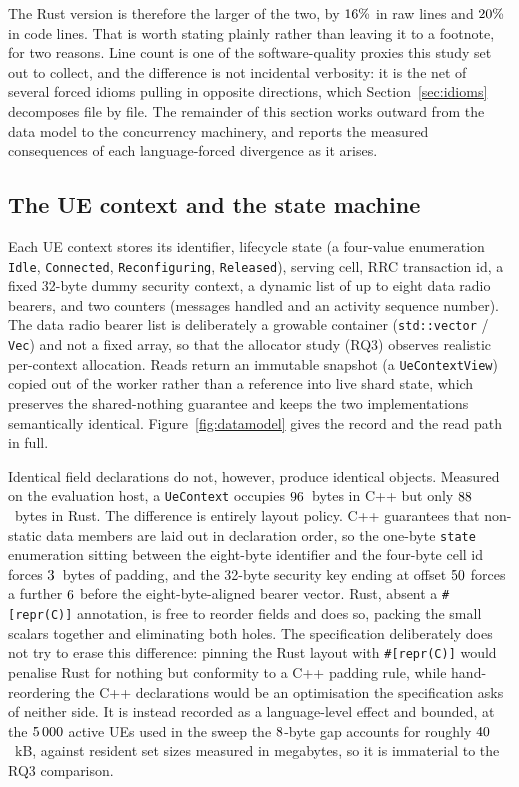 \documentclass[english,twoside,openright,a4paper,censored,csm,software-track-2020]{HYthesisML}
\begin{document}
The Rust version is therefore the larger of the two, by $16\%$ in raw lines and
$20\%$ in code lines. That is worth stating plainly rather than leaving it to a footnote, for two reasons. Line
count is one of the software-quality proxies this study set out to collect, and the difference
is not incidental verbosity: it is the net of several forced idioms pulling in opposite
directions, which Section~\ref{sec:idioms} decomposes file by file. The remainder of this
section works outward from the data model to the concurrency machinery, and reports the measured
consequences of each language-forced divergence as it arises.

\subsection{The UE context and the state machine}\label{sec:uecontext}
Each UE context stores its identifier, lifecycle state (a four-value enumeration
\texttt{Idle}, \texttt{Connected}, \texttt{Reconfiguring}, \texttt{Released}), serving cell,
RRC transaction id, a fixed 32-byte dummy security context, a dynamic list of up to eight data
radio bearers, and two counters (messages handled and an activity sequence number). The data
radio bearer list is deliberately a growable container (\texttt{std::vector} / \texttt{Vec})
and not a fixed array, so that the allocator study (RQ3) observes realistic per-context
allocation. Reads return an immutable snapshot (a \texttt{UeContextView}) copied out of the
worker rather than a reference into live shard state, which preserves the shared-nothing
guarantee and keeps the two implementations semantically identical.
Figure~\ref{fig:datamodel} gives the record and the read path in full.

Identical field declarations do not, however, produce identical objects. Measured on the
evaluation host, a \texttt{UeContext} occupies $96$~bytes in C++ but only
$88$~bytes in Rust.
The difference is entirely layout policy. C++ guarantees that non-static data members are laid
out in declaration order, so the one-byte \texttt{state} enumeration sitting between the
eight-byte identifier and the four-byte cell id forces $3$~bytes of padding, and the
32-byte security key ending at offset $50$ forces a further $6$ before the eight-byte-aligned
bearer vector. Rust, absent a \texttt{\#[repr(C)]} annotation, is free to reorder fields and
does so, packing the small scalars together and eliminating both holes. The specification
deliberately does not try to erase this difference: pinning the Rust layout with
\texttt{\#[repr(C)]} would penalise Rust for nothing but conformity to a C++ padding rule,
while hand-reordering the C++ declarations would be an optimisation the specification asks of
neither side. It is instead recorded as a language-level effect and bounded, at the $5\,000$
active UEs used in the sweep the $8$-byte gap accounts for roughly $40$~kB, against resident
set sizes measured in megabytes, so it is immaterial to the RQ3 comparison.
\end{document}
